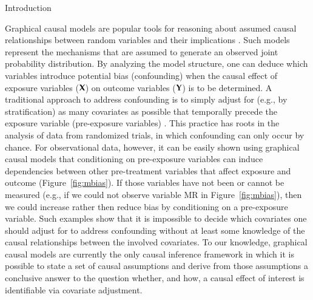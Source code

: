 \let\inputiffinal=




\section{Introduction}\label{sec:intro}


Graphical causal models are popular tools for reasoning about assumed causal relationships between random variables and their implications \citep{Pearl2009,Elwert2013}. Such models represent the mechanisms that are assumed to generate an observed joint probability distribution. By analyzing the model structure, one can deduce which variables introduce potential bias (confounding) when the causal effect of exposure variables ($ {\bf X} $) on outcome variables ($ {\bf Y} $) is to be determined.
A traditional approach to address confounding is to simply adjust for (e.g., by stratification) as many covariates as possible that temporally precede the exposure variable (pre-exposure variables) \cite{Shrier2008,Rubin2008}. This practice has roots in the analysis of data from randomized trials, in which confounding can only occur by chance. For observational data, however, it can be easily shown using graphical causal models that conditioning on pre-exposure variables can induce dependencies between other pre-treatment variables that affect exposure and outcome (Figure~\ref{fig:mbias}). If those variables have not been or cannot be measured (e.g., if we could not observe variable MR in Figure~\ref{fig:mbias}), then we could increase rather then reduce bias by conditioning on a pre-exposure variable. Such examples show that it is impossible to decide which covariates one should  adjust for to address confounding without at least some knowledge of the causal relationships between the involved covariates. To our knowledge, graphical causal models are currently the only causal inference framework in which it is possible to state a set of causal assumptions and derive from those assumptions a conclusive answer to the question whether, and how, a causal effect of interest is identifiable via covariate adjustment. 

